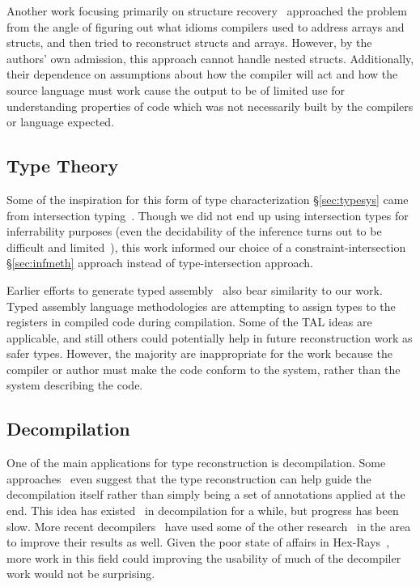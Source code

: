 Another work focusing primarily on structure recovery~\cite{comprecon} approached the problem from the angle of figuring out what idioms compilers used to address arrays and structs, and then tried to reconstruct structs and arrays. However, by the authors' own admission, this approach cannot handle nested structs. Additionally, their dependence on assumptions about how the compiler will act and how the source language must work cause the output to be of limited use for understanding properties of code which was not necessarily built by the compilers or language expected.

\subsection{Type Theory}
Some of the inspiration for this form of type characterization \S\ref{sec:typesys} came from intersection typing~\cite{Jim1995,Shao1993}. Though we did not end up using intersection types for inferrability purposes (even the decidability of the inference turns out to be difficult and limited~\cite{interdecide}), this work informed our choice of a constraint-intersection \S\ref{sec:infmeth} approach instead of type-intersection approach.

Earlier efforts to generate typed assembly~\cite{tal,stal} also bear similarity to our work. Typed assembly language methodologies are attempting to assign types to the registers in compiled code during compilation. Some of the TAL ideas are applicable, and still others could potentially help in future reconstruction work as safer types.
However, the majority are inappropriate for the work because the compiler or author must make the code conform to the system, rather than the system describing the code.

\subsection{Decompilation}
One of the main applications for type reconstruction is decompilation. Some approaches~\cite{tydecomp} even suggest that the type reconstruction can help guide the decompilation itself rather than simply being a set of annotations applied at the end. This idea has existed~\cite{dolgova2009automatic} in decompilation for a while, but progress has been slow. More recent decompilers~\cite{phoenix} have used some of the other research~\cite{tie} in the area to improve their results as well. Given the poor state of affairs in Hex-Rays~\cite{ida}, more work in this field could improving the usability of much of the decompiler work would not be surprising.
